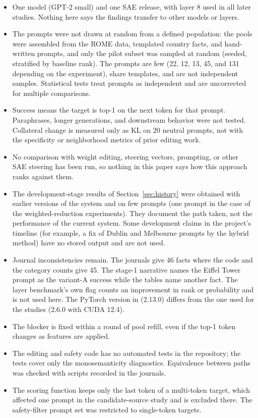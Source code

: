 \documentclass[conference]{IEEEtran}
\newcommand{\code}[1]{\texttt{\detokenize{#1}}}
\begin{document}
\begin{itemize}
\item One model (GPT-2 small) and one SAE release, with layer 8 used in all later studies. Nothing here says the findings transfer to other models or layers.
\item The prompts were not drawn at random from a defined population: the pools were assembled from the ROME data, templated country facts, and hand-written prompts, and only the pilot subset was sampled at random (seeded, stratified by baseline rank). The prompts are few (22, 12, 13, 45, and 131 depending on the experiment), share templates, and are not independent samples. Statistical tests treat prompts as independent and are uncorrected for multiple comparisons.
\item Success means the target is top-1 on the next token for that prompt. Paraphrases, longer generations, and downstream behavior were not tested. Collateral change is measured only as KL on 20 neutral prompts, not with the specificity or neighborhood metrics of prior editing work.
\item No comparison with weight editing, steering vectors, prompting, or other SAE steering has been run, so nothing in this paper says how this approach ranks against them.
\item The development-stage results of Section~\ref{sec:history} were obtained with earlier versions of the system and on few prompts (one prompt in the case of the weighted-reduction experiments). They document the path taken, not the performance of the current system. Some development claims in the project's timeline (for example, a fix of Dublin and Melbourne prompts by the hybrid method) have no stored output and are not used.
\item Journal inconsistencies remain. The journals give 46 facts where the code and the category counts give 45. The stage-1 narrative names the Eiffel Tower prompt as the variant-A success while the tables name another fact. The layer benchmark's own \code{success} flag counts an improvement in rank or probability and is not used here. The PyTorch version in \code{requirements.txt} (2.13.0) differs from the one used for the studies (2.6.0 with CUDA 12.4).
\item The blocker is fixed within a round of pool refill, even if the top-1 token changes as features are applied.
\item The editing and safety code has no automated tests in the repository; the tests cover only the monosemanticity diagnostics. Equivalence between paths was checked with scripts recorded in the journals.
\item The scoring function keeps only the last token of a multi-token target, which affected one prompt in the candidate-source study and is excluded there. The safety-filter prompt set was restricted to single-token targets.
\end{itemize}
\end{document}

